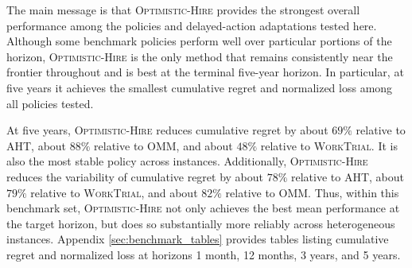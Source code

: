 \documentclass[opre,blindrev]{informs3}
\begin{document}
The main message is that \textsc{Optimistic-Hire} provides the strongest overall performance among the policies and delayed-action adaptations tested here. Although some benchmark policies perform well over particular portions of the horizon, \textsc{Optimistic-Hire} is the only method that remains consistently near the frontier throughout and is best at the terminal five-year horizon. In particular, at five years it achieves the smallest cumulative regret and normalized loss among all policies tested.


At five years, \textsc{Optimistic-Hire} reduces cumulative regret by about \(69\%\) relative to \textsc{AHT}, about \(88\%\) relative to \textsc{OMM}, and about \(48\%\) relative to \textsc{WorkTrial}. It is also the most stable policy across instances. Additionally, \textsc{Optimistic-Hire} reduces the variability of cumulative regret by about \(78\%\) relative to \textsc{AHT}, about \(79\%\) relative to \textsc{WorkTrial}, and about \(82\%\) relative to \textsc{OMM}. Thus, within this benchmark set, \textsc{Optimistic-Hire} not only achieves the best mean performance at the target horizon, but does so substantially more reliably across heterogeneous instances. Appendix \ref{sec:benchmark_tables} provides tables listing cumulative regret and normalized loss at horizons 1 month, 12 months, 3 years, and 5 years.
\end{document}
